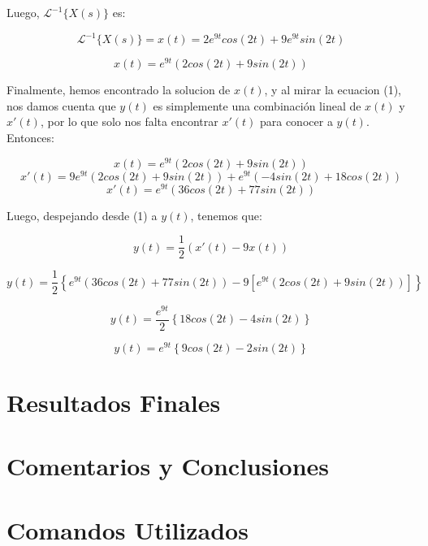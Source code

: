 \documentclass[12pt,letterpaper]{article}
\begin{document}
Luego, $\mathcal{L}^{-1}\{X(s)\}$ es:

\begin{equation*}\mathcal{L}^{-1}\{X(s)\} = x(t) = 2e^{9t}cos(2t) + 9e^{9t}sin(2t)\end{equation*}

\begin{equation}x(t) = e^{9t}\left(2cos(2t) + 9sin(2t)\right)\end{equation}

Finalmente, hemos encontrado la solucion de $x(t)$, y al mirar la ecuacion (1), nos damos cuenta que $y(t)$ es simplemente una combinación lineal de $x(t)$ y $x'(t)$, por lo que solo nos falta encontrar $x'(t)$ para conocer a $y(t)$. Entonces:

\begin{equation*}x(t) = e^{9t}\left(2cos(2t) + 9sin(2t)\right)\end{equation*}
\begin{equation*}x'(t) = 9e^{9t}\left(2cos(2t) + 9sin(2t)\right) + e^{9t}\left(-4sin(2t) + 18cos(2t)\right)\end{equation*}
\begin{equation}x'(t) = e^{9t}\left(36cos(2t)+77sin(2t)\right)\end{equation}

Luego, despejando desde (1) a $y(t)$, tenemos que:

\begin{equation}y(t)=\dfrac{1}{2}\left(x'(t)-9x(t)\right)\end{equation}

\begin{equation}y(t) = \dfrac{1}{2}\left\{ e^{9t}\left(36cos(2t)+77sin(2t)\right) - 9\left[ e^{9t}\left(2cos(2t) + 9sin(2t)\right)\right] \right\}\end{equation}

\begin{equation}y(t) = \dfrac{e^{9t}}{2}\left\{ 18cos(2t) - 4sin(2t) \right\}\end{equation}

\begin{equation}y(t) = e^{9t}\left\{ 9cos(2t) - 2sin(2t) \right\}\end{equation}

\section{Resultados Finales}

\section{Comentarios y Conclusiones}

\section{Comandos Utilizados}
\end{document}
